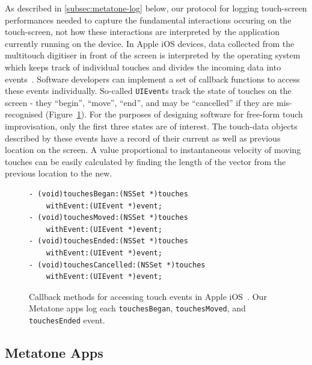 \documentclass[graybox]{svmult}
\begin{document}
As described in \ref{subsec:metatone-log} below, our protocol for
logging touch-screen performances needed to capture the fundamental
interactions occuring on the touch-screen, not how these interactions
are interpreted by the application currently running on the device. In
Apple iOS devices, data collected from the multitouch digitiser in
front of the screen is interpreted by the operating system which keeps
track of individual touches and divides the incoming data into
events~\cite{AppleDeveloper:2015rm}. Software developers can implement
a set of callback functions to access these events individually.
So-called \texttt{UIEvent}s track the state of touches on the screen -
they ``begin'', ``move'', ``end'', and may be ``cancelled'' if they
are mis-recognised (Figure~\ref{touch-event-code-listing}). For the purposes of designing software for
free-form touch improvisation, only the first three states are of
interest. The touch-data objects described by these events have a
record of their current as well as previous location on the screen. A
value proportional to instantaneous velocity of moving touches can be
easily calculated by finding the length of the vector from the
previous location to the new.

\begin{figure}
\begin{verbatim}
- (void)touchesBegan:(NSSet *)touches 
    withEvent:(UIEvent *)event;
- (void)touchesMoved:(NSSet *)touches 
    withEvent:(UIEvent *)event;
- (void)touchesEnded:(NSSet *)touches 
    withEvent:(UIEvent *)event;
- (void)touchesCancelled:(NSSet *)touches 
    withEvent:(UIEvent *)event;
\end{verbatim}
  \caption{Callback methods for accessing touch events in Apple
    iOS~\cite{AppleDeveloper:2015rm}. Our Metatone apps log each
    \texttt{touchesBegan}, \texttt{touchesMoved}, and
    \texttt{touchesEnded} event.}
\label{touch-event-code-listing}
\end{figure}


\subsection{Metatone Apps}
\label{subsec:metatone-apps}
\end{document}
